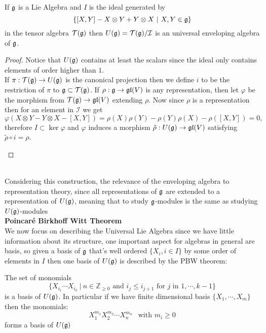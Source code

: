 \begin{prop}
	If $\mathfrak{g}$ is a Lie Algebra and $I$ is the ideal generated by $$\{[X,Y]-X\otimes Y + Y \otimes X \ | \ X,Y \in \mathfrak{g}\}$$ in the tensor algebra $\mathcal{T}(\mathfrak{g})$ then $U(\mathfrak{g})=\mathcal{T}(\mathfrak{g})/\mathcal{I}$ is an universal enveloping algebra of $\mathfrak{g}$.
\end{prop}
\begin{proof}
	Notice that $U(\mathfrak{g})$ contains at least the scalars since the ideal only contains elements of order higher than $1$.\\
	If $\pi : \mathcal{T}(\mathfrak{g}) \rightarrow U(\mathfrak{g})$ is the canonical projection then we define $i$ to be the restriction of $\pi$ to $\mathfrak{g} \subset \mathcal{T}(\mathfrak{g})$.
	If $\rho: \mathfrak{g} \rightarrow \mathfrak{gl}(V)$ is any representation, then let $\varphi$ be the morphism from $\mathcal{T}(\mathfrak{g}) \rightarrow \mathfrak{gl}(V)$ extending $\rho$. Now since $\rho$ is a representation then for an element in $\mathcal{I}$ we get
	$$ \varphi(X \otimes Y - Y \otimes X - [X,Y])= \rho(X)\rho(Y) - \rho(Y)\rho(X) - \rho([X,Y])=0,$$
	therefore $I \subset \ker \varphi$ and $\varphi$ induces a morphism $\tilde{\rho}:U(\mathfrak{g})\rightarrow \mathfrak{gl}(V)$ satisfying $ \tilde{\rho} \circ i = \rho$.
	\begin{center}
	\end{center}
\end{proof}\\
Considering this construction, the relevance of the enveloping algebra to representation theory, since all representations of $\mathfrak{g}$ are extended to a representation of $U(\mathfrak{g})$, meaning that to study $\mathfrak{g}$-modules is the same as studying $U(\mathfrak{g})$-modules\\
\newpage
\textbf{Poincaré Birkhoff Witt Theorem}\\
We now focus on describing the Universal Lie Algebra since we have little information about its structure, one important aspect for algebras in general are basis, so given a basis of $\mathfrak{g}$ that's well ordered $\{X_i, i \in I\}$ by some order of elements in $I$ then one basis of $U(\mathfrak{g})$ is described by the PBW theorem:\\
\begin{teo}
	The set of monomials $$\{X_{i_1} \cdots X_{i_k} \ | \ n \in \mathbb{Z}_{\ge{0}} \text { and } i_j \le i_{j+1} \text{ for $j$ in } 1,\cdots,k-1\}$$ is a basis of $U(\mathfrak{g})$. In particular if we have finite dimensional basis $\{X_1,\cdots,X_m\}$ then the monomials:
	$$ X_1^{m_1}X_2^{m_2}\cdots X_n^{m_n} \ \ \text{ with } m_i\ge0$$
	forms a basis of $U(\mathfrak{g})$
	\label{41PBWProof}
\end{teo}
